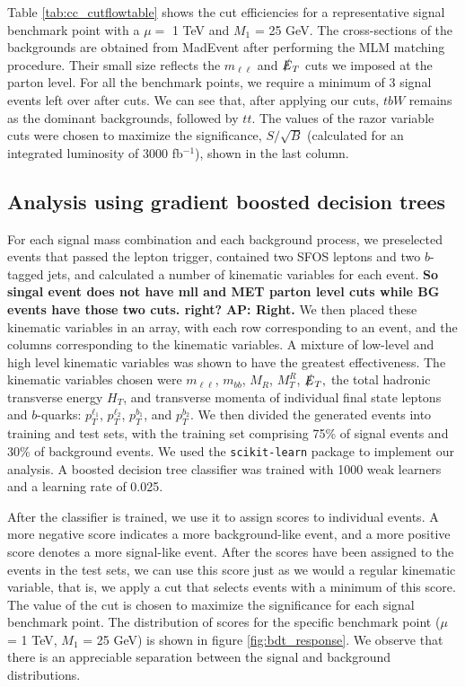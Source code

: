 \documentclass[a4paper,11pt]{article}
\newcommand{\Shufang}[1]{{\bf\color{Maroon}  #1}}
\newcommand{\Adarsh}[1]{{\bf\color{RoyalBlue} AP: #1}}
\begin{document}
Table \ref{tab:cc_cutflowtable} shows the cut efficiencies for a representative
signal benchmark point with a $\mu =$ 1 TeV and $M_1$ = 25 GeV.   The
cross-sections of the backgrounds are obtained from MadEvent after performing the MLM matching procedure. Their small size reflects
the $m_{\ell\ell}$ and $\slashed{E}_T$ cuts we imposed at the parton level. For all
the benchmark points, we require a minimum of 3 signal events left over after
cuts. We can see that, after applying our cuts, $tbW$ remains as the
dominant backgrounds, followed by $tt$.   The values of the razor variable cuts were chosen to
maximize the significance, $S/\sqrt{B}$ (calculated for an integrated luminosity
of 3000 fb$^{-1}$), shown in the last column.  

\subsection{Analysis using gradient boosted decision trees}\label{subsec:bdt}

For each signal mass combination and each background process, we preselected
events that passed the lepton trigger, contained two SFOS leptons and two
$b$-tagged jets, and calculated a number of kinematic variables for each event.
  \Shufang{So singal event does not have mll and MET parton level cuts 
  while BG events have those two cuts. right?} \Adarsh{Right.}   We then
placed these kinematic variables in an array, with each row corresponding to an
event, and the columns corresponding to the kinematic variables. A mixture of
low-level and high level kinematic variables was shown to have the greatest
effectiveness. The kinematic variables chosen were $m_{\ell\ell}$, $m_{bb}$,
$M_R$, $M_T^R$, $\slashed{E}_T,$ the total hadronic transverse energy $H_T$,
and transverse momenta of individual final state leptons and $b$-quarks:
$p_T^{\ell_1}$, $p_T^{\ell_2}$, $p_T^{b_1}$, and $p_T^{b_2}$. We then divided
the generated events into training and test sets, with the training set
comprising 75\% of signal events and 30\% of background events.  We used the
\texttt{scikit-learn} package  \cite{Pedregosa2011} to implement our analysis.
A boosted decision tree classifier was trained with 1000 weak learners and a
learning rate of 0.025.  

After the classifier is trained, we use it to assign scores to individual
events. A more negative score indicates a more background-like event, and a
more positive score denotes a more signal-like event. After the scores have
been assigned to the events in the test sets, we can use this score just as we
would a regular kinematic variable, that is, we apply a cut that selects
events with a minimum of this score. The value of the cut is chosen to maximize
the significance for each signal benchmark point. The distribution of scores
for the specific benchmark point ($\mu$ = 1 TeV, $M_1$ = 25 GeV) is shown in
figure \ref{fig:bdt_response}. We observe that there is an appreciable
separation between the signal and background distributions.
\end{document}
